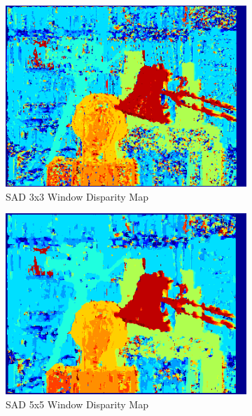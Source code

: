 \begin{figure}
\begin{center}
	\begin{subfigure}{0.45\textwidth}
		\includegraphics[width=\textwidth]{figures/sad_tsukuba_3x3_0-15.png}
		\caption{SAD 3x3 Window Disparity Map}
		\label{fig:tsukuba3x3}
	\end{subfigure}
	\begin{subfigure}{0.45\textwidth}
		\includegraphics[width=\textwidth]{figures/sad_tsukuba_5x5_0-15.png}
		\caption{SAD 5x5 Window Disparity Map}
		\label{fig:tsukuba5x5}
	\end{subfigure}
	\\
	\begin{subfigure}{0.45\textwidth}

\end{subfigure}
\end{center}
\end{figure}

